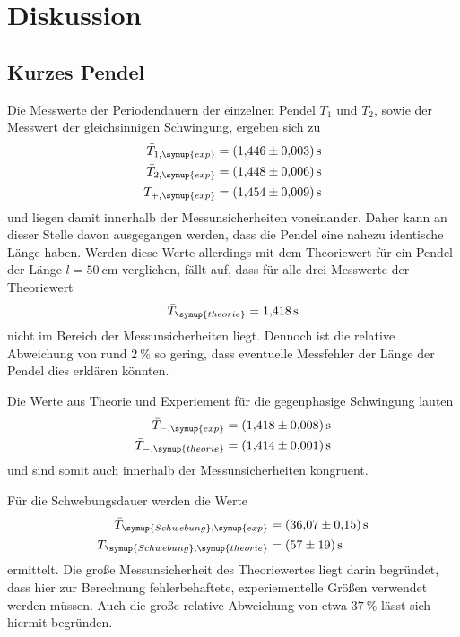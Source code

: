 \section{Diskussion}
\label{sec:Diskussion}
\subsection{Kurzes Pendel}
Die Messwerte der Periodendauern der einzelnen Pendel $T_1$ und $T_2$, sowie der Messwert der gleichsinnigen Schwingung, ergeben sich zu 
\begin{align*}
    \bar{T}_{1,\symup{exp}} &= \qty{1.446+-0.003}{\second} \\
    \bar{T}_{2,\symup{exp}} &= \qty{1.448+-0.006}{\second} \\
    \bar{T}_{+,\symup{exp}} &= \qty{1.454+-0.009}{\second}
    \end{align*}
und liegen damit innerhalb der Messunsicherheiten voneinander. Daher kann an dieser Stelle davon ausgegangen werden,
dass die Pendel eine nahezu identische Länge haben.
Werden diese Werte allerdings mit dem Theoriewert für ein Pendel der Länge $l=\qty{50}{\centi\metre}$ verglichen, fällt auf, dass für alle drei
Messwerte der Theoriewert
\begin{equation*}
    \bar{T}_{\symup{theorie}} = \qty{1.418}{\second}
\end{equation*}
nicht im Bereich der Messunsicherheiten liegt. Dennoch ist die relative Abweichung von rund $\qty{2}{\percent}$ so gering, dass eventuelle Messfehler der
Länge der Pendel dies erklären könnten.

Die Werte aus Theorie und Experiement für die gegenphasige Schwingung lauten
\begin{align*}
    \bar{T}_{-,\symup{exp}} &= \qty{1.418+-0.008}{\second} \\
    \bar{T}_{-,\symup{theorie}} &= \qty{1.414+-0.001}{\second}
\end{align*}
und sind somit auch innerhalb der Messunsicherheiten kongruent.

Für die Schwebungsdauer werden die Werte
\begin{align*}
    \bar{T}_{\symup{Schwebung},\symup{exp}} &= \qty{36.07+-0.15}{\second} \\
    \bar{T}_{\symup{Schwebung},\symup{theorie}} &= \qty{57+-19}{\second}
\end{align*}
ermittelt. Die große Messunsicherheit des Theoriewertes liegt darin begründet, dass hier zur Berechnung fehlerbehaftete, experiementelle
Größen verwendet werden müssen. Auch die große relative Abweichung von etwa $\qty{37}{\percent}$ lässt sich hiermit begründen.

